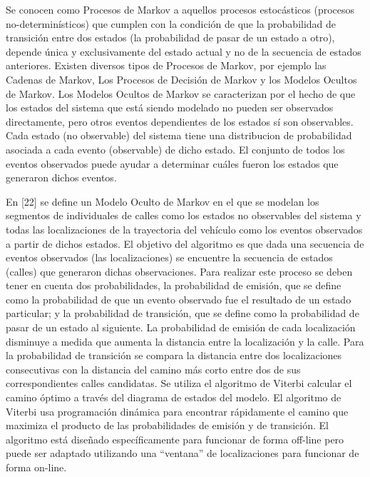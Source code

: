 \documentclass[final,fmstyle]{fpunathesis}
\begin{document}
Se conocen como Procesos de Markov a aquellos procesos estocásticos (procesos no-determinísticos) que cumplen con la condición de que la probabilidad de transición entre dos estados (la probabilidad de pasar de un estado a otro), depende única y exclusivamente del estado actual y no de la secuencia de estados anteriores. Existen diversos tipos de Procesos de Markov, por ejemplo las Cadenas de Markov, Los Procesos de Decisión de Markov y los Modelos Ocultos de Markov. Los Modelos Ocultos de Markov se caracterizan por el hecho de que los estados del sistema  que está siendo modelado no pueden ser observados directamente, pero otros eventos dependientes de los estados sí son observables. Cada estado (no observable) del sistema tiene una distribucion de probabilidad asociada a cada evento (observable) de dicho estado. El conjunto de todos los eventos observados puede ayudar a determinar cuáles fueron los estados que generaron dichos eventos.

En [22] se define un Modelo Oculto de Markov en el que se modelan los segmentos de individuales de calles como los estados no observables del sistema y todas las localizaciones de la trayectoria del vehículo como los eventos observados a partir de dichos estados. El objetivo del algoritmo es que dada una secuencia de eventos observados (las localizaciones) se encuentre la secuencia de estados (calles) que generaron dichas observaciones. Para realizar este proceso se deben tener en cuenta dos probabilidades, la probabilidad de emisión, que se define como la probabilidad de que un evento observado fue el resultado de un estado particular; y la probabilidad de transición, que se define como la probabilidad de pasar de un estado al siguiente. La probabilidad de emisión de cada localización disminuye a medida que aumenta la distancia entre la localización y la calle. Para la probabilidad de transición se compara la distancia entre dos localizaciones consecutivas con la distancia del camino más corto entre dos de sus correspondientes calles candidatas. Se utiliza el algoritmo de Viterbi calcular el camino óptimo a través del diagrama de estados del modelo. El algoritmo de Viterbi usa programación dinámica para encontrar rápidamente el camino que maximiza el producto de las probabilidades de emisión y de transición. El algoritmo está diseñado específicamente para funcionar de forma off-line pero puede ser adaptado utilizando una “ventana” de localizaciones para funcionar de forma on-line.
\end{document}
